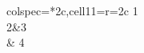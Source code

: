 \documentclass{standalone}
\begin{document}
\begin{tblr}{colspec={*{2}{c}},cell{1}{1}={r=2}{c}}
    {1   \\2}&3\\
     & 4 \\
\end{tblr}
\end{document}
